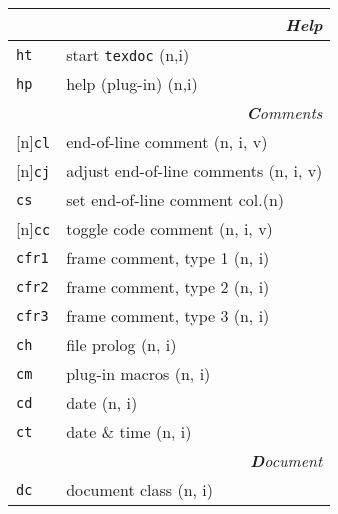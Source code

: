 \documentclass[oneside,10pt,landscape,DIV17]{scrartcl}
\newcommand{\Rep}{{\scriptsize{[n]}}}
\newcommand{\Map}[1] {\textbf{\textasciiacute}\texttt{#1}}
\begin{document}
\begin{multicols}{3}
\begin{center}
\begin{tabular}[]{|p{11mm}|p{60mm}|}
\hline 
\multicolumn{2}{|r|}{\textsl{\textbf{H}elp}}\\[1.0ex]
\hline \Map{ht}   & start \texttt{texdoc}           \hfill (n,i)\\
\hline \Map{hp}   & help (plug-in)                  \hfill (n,i)\\
\hline 
\hline
\multicolumn{2}{|r|}{\textsl{\textbf{C}omments}}    \\[1.0ex]
\hline \Rep\Map{cl}   & end-of-line comment         \hfill (n, i, v)\\
\hline \Rep\Map{cj}   & adjust end-of-line comments \hfill (n, i, v)\\
\hline     \Map{cs}   & set end-of-line comment col.\hfill (n)      \\
%
\hline \Rep\Map{cc}   & toggle code comment         \hfill (n, i, v)\\
%
\hline     \Map{cfr1} & frame comment, type 1       \hfill (n, i)   \\
\hline     \Map{cfr2} & frame comment, type 2       \hfill (n, i)   \\
\hline     \Map{cfr3} & frame comment, type 3       \hfill (n, i)   \\
\hline     \Map{ch}   & file prolog                 \hfill (n, i)   \\
\hline     \Map{cm}   & plug-in macros              \hfill (n, i)   \\
\hline     \Map{cd}   & date                        \hfill (n, i)   \\
\hline     \Map{ct}   & date \& time                \hfill (n, i)   \\
\hline
\hline
\multicolumn{2}{|r|}{\textsl{\textbf{D}ocument}}                 \\[1.0ex]
\hline     \Map{dc}  &  document class              \hfill (n, i)\\

\end{tabular}
\end{center}
\end{multicols}
\end{document}
